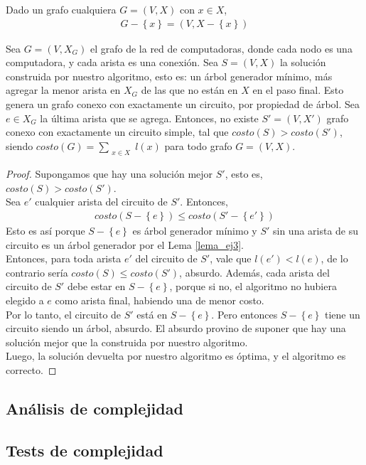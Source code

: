\begin{notacion}
Dado un grafo cualquiera $G = (V,X)$ con $x \in X$, 
\begin{align*}
G - \left\{x\right\} = (V, X - \left\{x\right\})
\end{align*}
\end{notacion}

\begin{correctidud}
Sea $G = (V,X_G)$ el grafo de la red de computadoras, donde cada nodo es una computadora, y cada arista es una conexión. Sea $S = (V,X)$ la solución construida por nuestro algoritmo, esto es: un árbol generador mínimo, más agregar la menor arista en $X_G$ de las que no están en $X$ en el paso final. Esto genera un grafo conexo con exactamente un circuito, por propiedad de árbol. Sea $e \in X_G$ la última arista que se agrega. Entonces, no existe $S' = (V,X')$ grafo conexo con exactamente un circuito simple, tal que $costo(S) > costo(S')$, siendo $costo(G) = \sum\limits_{\substack{x \in X}} l(x)$ para todo grafo $G = (V,X)$.
\end{correctidud}
\begin{proof}
Supongamos que hay una solución mejor $S'$, esto es, $costo(S) > costo(S')$. \\
\noindent Sea $e'$ cualquier arista del circuito de $S'$. Entonces,
\begin{align*}
costo(S - \left\{e\right\}) \leq costo(S' - \left\{e'\right\})
\end{align*}
Esto es así porque $S - \left\{e\right\}$ es árbol generador mínimo y $S'$ sin una arista de su circuito es un árbol generador por el Lema \ref{lema_ej3}. \\
Entonces, para toda arista $e'$ del circuito de $S'$, vale que $l(e') < l(e)$, de lo contrario sería $costo(S) \leq costo(S')$, absurdo.
Además, cada arista del circuito de $S'$ debe estar en $S - \left\{e\right\}$, porque si no, el algoritmo no hubiera elegido a $e$ como arista final, habiendo una de menor costo. \\
Por lo tanto, el circuito de $S'$ está en $S - \left\{e\right\}$. Pero entonces $S - \left\{e\right\}$ tiene un circuito siendo un árbol, absurdo. El absurdo provino de suponer que hay una solución mejor que la construida por nuestro algoritmo. \\
Luego, la solución devuelta por nuestro algoritmo es óptima, y el algoritmo es correcto.
\end{proof}

\subsection{Análisis de complejidad}

\subsection{Tests de complejidad}
